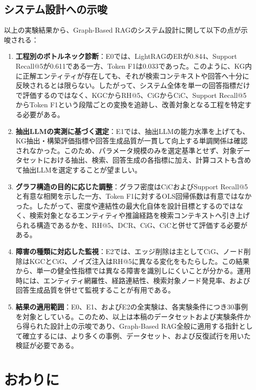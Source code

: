 \documentclass[a4j,dvipdfmx]{jsarticle}
\begin{document}
\subsection{システム設計への示唆}
以上の実験結果から、Graph-Based RAGのシステム設計に関して以下の点が示唆される：
\begin{enumerate}
    \item \textbf{工程別のボトルネック診断}：E0では、LightRAGのERが0.844、Support Recall@5が0.611である一方、Token F1は0.033であった。このように、KG内に正解エンティティが存在しても、それが検索コンテキストや回答へ十分に反映されるとは限らない。したがって、システム全体を単一の回答指標だけで評価するのではなく、KGCからRH@5、CiGからCiC、Support Recall@5からToken F1という段階ごとの変換を追跡し、改善対象となる工程を特定する必要がある。
    \item \textbf{抽出LLMの実測に基づく選定}：E1では、抽出LLMの能力水準を上げても、KG抽出・構築評価指標や回答生成品質が一貫して向上する単調関係は確認されなかった。このため、パラメータ規模のみを選定基準とせず、対象データセットにおける抽出、検索、回答生成の各指標に加え、計算コストも含めて抽出LLMを選定することが望ましい。
    \item \textbf{グラフ構造の目的に応じた調整}：グラフ密度はCiCおよびSupport Recall@5と有意な相関を示した一方、Token F1に対するOLS回帰係数は有意ではなかった。したがって、密度や連結性の最大化自体を設計目標とするのではなく、検索対象となるエンティティや推論経路を検索コンテキストへ引き上げられる構造であるかを、RH@5、DCR、CiG、CiCと併せて評価する必要がある。
    \item \textbf{障害の種類に対応した監視}：E2では、エッジ削除は主としてCiG、ノード削除はKGCとCiG、ノイズ注入はRH@5に異なる変化をもたらした。この結果から、単一の健全性指標では異なる障害を識別しにくいことが分かる。運用時には、エンティティ網羅性、経路連結性、検索対象ノード発見率、および回答生成品質を併せて監視することが有用である。
    \item \textbf{結果の適用範囲}：E0、E1、およびE2の全実験は、各実験条件につき30事例を対象としている。このため、以上は本稿のデータセットおよび実験条件から得られた設計上の示唆であり、Graph-Based RAG全般に適用する指針として確立するには、より多くの事例、データセット、および反復試行を用いた検証が必要である。
\end{enumerate}


\section{おわりに}
\end{document}
